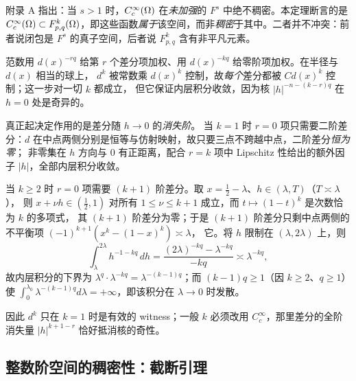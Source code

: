 \begin{remark}
附录 A 指出：当 $s>1$ 时，$C_c^\infty(\Omega)$ 在\emph{未加强}的 $F^s$ 中绝不稠密。本定理断言的是 $C_c^\infty(\Omega)\subset F^k_{p,q}(\Omega)$，即这些函数\emph{属于}该空间，而非\emph{稠密}于其中。二者并不冲突：前者说闭包是 $F^s$ 的真子空间，后者说 $F^k_{p,q}$ 含有非平凡元素。
\end{remark}

\begin{remark}[直觉：为何 $k=1$ 可以，$k\ge2$ 不行]
范数用 $d(x)^{-rq}$ 给第 $r$ 个差分项加权、用 $d(x)^{-kq}$ 给零阶项加权。在半径与 $d(x)$ 相当的球上，
$d^k$ 被常数乘 $d(x)^k$ 控制，故\emph{每个}差分都被 $Cd(x)^k$ 控制；这一步对一切 $k$ 都成立，
但它保证内层积分收敛，因为核 $|h|^{-n-(k-r)q}$ 在 $h=0$ 处是奇异的。

真正起决定作用的是差分随 $h\to0$ 的\emph{消失阶}。
当 $k=1$ 时 $r=0$ 项只需要二阶差分：$d$ 在中点两侧分别是恒等与仿射映射，故只要三点不跨越中点，二阶差分\emph{恒为零}；
非零集在 $h$ 方向与 $0$ 有正距离，配合 $r=k$ 项中 Lipschitz 性给出的额外因子 $|h|$，全部内层积分收敛。

当 $k\ge2$ 时 $r=0$ 项需要 $(k+1)$ 阶差分。取 $x=\tfrac12-\lambda$、$h\in(\lambda,T)$（$T\asymp\lambda$），
则 $x+\nu h\in(\tfrac12,1)$ 对所有 $1\le\nu\le k+1$ 成立，而 $t\mapsto(1-t)^k$ 是次数恰为 $k$ 的多项式，
其 $(k+1)$ 阶差分为零；于是 $(k+1)$ 阶差分只剩中点两侧的不平衡项 $(-1)^{k+1}(x^k-(1-x)^k)\asymp\lambda$，
它。将 $h$ 限制在 $(\lambda,2\lambda)$ 上，则
\[
  \int_{\lambda}^{2\lambda}h^{-1-kq}\,dh=\frac{(2\lambda)^{-kq}-\lambda^{-kq}}{-kq}\asymp\lambda^{-kq},
\]
故内层积分的下界为 $\lambda^{q}\cdot\lambda^{-kq}=\lambda^{-(k-1)q}$；而 $(k-1)q\ge1$（因 $k\ge2$、$q\ge1$）使
$\int_0^{\lambda_0}\lambda^{-(k-1)q}d\lambda=+\infty$，即该积分在 $\lambda\to0$ 时发散。

因此 $d^k$ 只在 $k=1$ 时是有效的 witness；一般 $k$ 必须改用 $C_c^\infty$，那里差分的全阶消失量 $|h|^{k+1-r}$ 恰好抵消核的奇性。
\end{remark}

\subsection{整数阶空间的稠密性：截断引理}

